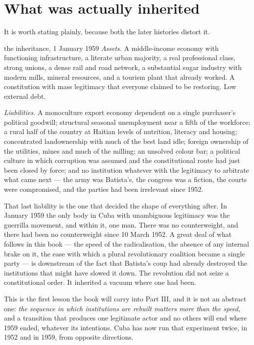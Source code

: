 \section{What was actually inherited}

It is worth stating plainly, because both the later histories distort it.

\begin{ledger}{the inheritance, 1 January 1959}
\emph{Assets.} A middle-income economy with functioning infrastructure, a
literate urban majority, a real professional class, strong unions, a dense rail
and road network, a substantial sugar industry with modern mills, mineral
resources, and a tourism plant that already worked. A constitution with mass
legitimacy that everyone claimed to be restoring. Low external debt.

\emph{Liabilities.} A monoculture export economy dependent on a single
purchaser's political goodwill; structural seasonal unemployment near a fifth
of the workforce; a rural half of the country at Haitian levels of nutrition,
literacy and housing; concentrated landownership with much of the best land
idle; foreign ownership of the utilities, mines and much of the milling; an
unsolved colour bar; a political culture in which corruption was assumed and
the constitutional route had just been closed by force; and no institution
whatever with the legitimacy to arbitrate what came next --- the army was
Batista's, the congress was a fiction, the courts were compromised, and the
parties had been irrelevant since 1952.
\end{ledger}

That last liability is the one that decided the shape of everything after. In
January 1959 the only body in Cuba with unambiguous legitimacy was the
guerrilla movement, and within it, one man. There was no counterweight, and
there had been no counterweight since 10 March 1952. A great deal of what
follows in this book --- the speed of the radicalisation, the absence of any
internal brake on it, the ease with which a plural revolutionary coalition
became a single party --- is downstream of the fact that Batista's coup had
already destroyed the institutions that might have slowed it down. The
revolution did not seize a constitutional order. It inherited a vacuum where
one had been.

This is the first lesson the book will carry into Part III, and it is not an
abstract one: \emph{the sequence in which institutions are rebuilt matters more
than the speed}, and a transition that produces one legitimate actor and no
others will end where 1959 ended, whatever its intentions. Cuba has now run
that experiment twice, in 1952 and in 1959, from opposite directions.
